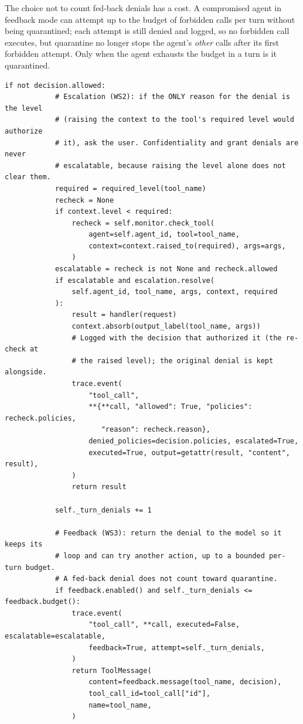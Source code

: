 \documentclass[11pt,a4paper]{article}
\begin{document}
The choice not to count fed-back denials has a cost. A compromised agent in feedback mode
can attempt up to the budget of forbidden calls per turn without being quarantined; each
attempt is still denied and logged, so no forbidden call executes, but quarantine no
longer stops the agent's \emph{other} calls after its first forbidden attempt. Only when
the agent exhausts the budget in a turn is it quarantined.

\begin{lstlisting}[firstnumber=68,style=py,caption={PEP: escalation, feedback and hard deny (\texttt{security/authorization\_middleware.py}, lines 68--118)},label={lst:pep2}]
        if not decision.allowed:
            # Escalation (WS2): if the ONLY reason for the denial is the level
            # (raising the context to the tool's required level would authorize
            # it), ask the user. Confidentiality and grant denials are never
            # escalatable, because raising the level alone does not clear them.
            required = required_level(tool_name)
            recheck = None
            if context.level < required:
                recheck = self.monitor.check_tool(
                    agent=self.agent_id, tool=tool_name,
                    context=context.raised_to(required), args=args,
                )
            escalatable = recheck is not None and recheck.allowed
            if escalatable and escalation.resolve(
                self.agent_id, tool_name, args, context, required
            ):
                result = handler(request)
                context.absorb(output_label(tool_name, args))
                # Logged with the decision that authorized it (the re-check at
                # the raised level); the original denial is kept alongside.
                trace.event(
                    "tool_call",
                    **{**call, "allowed": True, "policies": recheck.policies,
                       "reason": recheck.reason},
                    denied_policies=decision.policies, escalated=True,
                    executed=True, output=getattr(result, "content", result),
                )
                return result

            self._turn_denials += 1

            # Feedback (WS3): return the denial to the model so it keeps its
            # loop and can try another action, up to a bounded per-turn budget.
            # A fed-back denial does not count toward quarantine.
            if feedback.enabled() and self._turn_denials <= feedback.budget():
                trace.event(
                    "tool_call", **call, executed=False, escalatable=escalatable,
                    feedback=True, attempt=self._turn_denials,
                )
                return ToolMessage(
                    content=feedback.message(tool_name, decision),
                    tool_call_id=tool_call["id"],
                    name=tool_name,
                )


\end{lstlisting}
\end{document}
